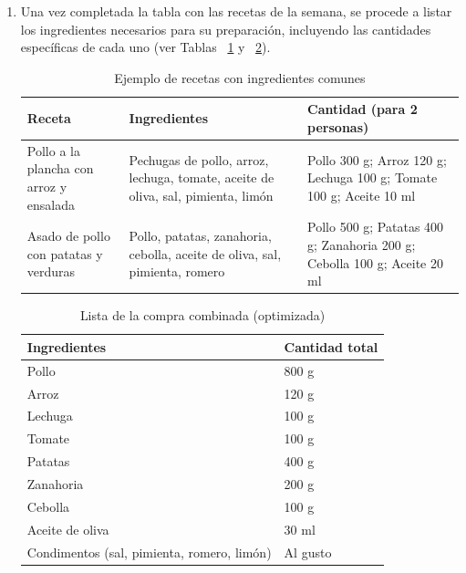 \documentclass[twoside, openright, 11pt]{report}
\begin{document}
\begin{enumerate}
	  	\item Una vez completada la tabla con las recetas de la semana, se procede a listar los ingredientes necesarios para su preparación, incluyendo las cantidades específicas de cada uno (ver Tablas ~\ref{fig:TablaDeIngredientes} y ~\ref{fig:TablaCombinada}).
	  	
	  	\begin{table}[H]
	  		\centering
	  		\caption{Ejemplo de recetas con ingredientes comunes}
	  		
	  		\begin{tabular}{|p{3.5cm}|p{7cm}|p{3cm}|}
	  			\hline
	  			\textbf{Receta} & \textbf{Ingredientes} & \textbf{Cantidad (para 2 personas)} \\ \hline
	  			
	  			Pollo a la plancha con arroz y ensalada 
	  			& Pechugas de pollo, arroz, lechuga, tomate, aceite de oliva, sal, pimienta, limón 
	  			& Pollo 300 g; Arroz 120 g; Lechuga 100 g; Tomate 100 g; Aceite 10 ml \\ \hline
	  			
	  			Asado de pollo con patatas y verduras 
	  			& Pollo, patatas, zanahoria, cebolla, aceite de oliva, sal, pimienta, romero 
	  			& Pollo 500 g; Patatas 400 g; Zanahoria 200 g; Cebolla 100 g; Aceite 20 ml \\ \hline
	  		\end{tabular}
	  		\label{fig:TablaDeIngredientes}
	  	\end{table}
	  	
	  	\begin{table}[H]
	  		\centering
	  		\caption{Lista de la compra combinada (optimizada)}
	  		
	  		\begin{tabular}{|p{5cm}|p{3cm}|}
	  			\hline
	  			\textbf{Ingredientes} & \textbf{Cantidad total} \\ \hline
	  			Pollo & 800 g \\ \hline
	  			Arroz & 120 g \\ \hline
	  			Lechuga & 100 g \\ \hline
	  			Tomate & 100 g \\ \hline
	  			Patatas & 400 g \\ \hline
	  			Zanahoria & 200 g \\ \hline
	  			Cebolla & 100 g \\ \hline
	  			Aceite de oliva & 30 ml \\ \hline
	  			Condimentos (sal, pimienta, romero, limón) & Al gusto \\ \hline
	  		\end{tabular}
	  		\label{fig:TablaCombinada}
	  	\end{table}
	  	

\end{enumerate}
\end{document}
